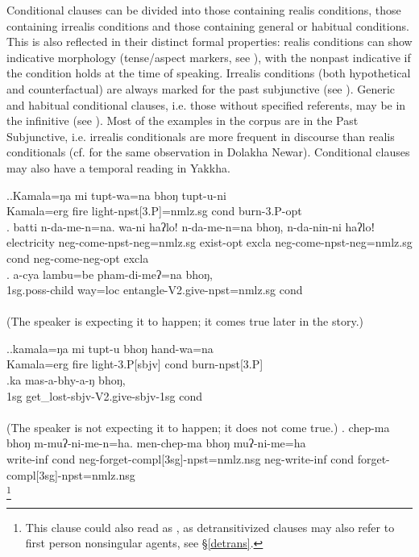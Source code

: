 Conditional clauses can be divided into those containing realis conditions, those containing irrealis conditions and those containing general or habitual conditions. This is also reflected in their  distinct formal properties: realis conditions can show indicative morphology (tense/aspect markers, see \Next), with the nonpast indicative if the condition holds at the time of speaking. Irrealis conditions (both hypothetical and counterfactual) are always marked for the past subjunctive (see \NNext). Generic and habitual conditional clauses, i.e. those without specified referents, may be in the infinitive (see \NNext[c]). Most of the examples in the  corpus are in the Past Subjunctive, i.e. irrealis conditionals are more frequent in discourse than realis conditionals (cf. \citet[463]{Genetti2007_Newari} for the same observation in Dolakha Newar). Conditional clauses may also have a temporal reading in Yakkha. 


	\ex.\ag.Kamala=ŋa mi tupt-wa=na bhoŋ tupt-u-ni \\
	Kamala{\sc =erg} fire   light{\sc -npst[3.P]=nmlz.sg} {\sc cond} burn{\sc -3.P-opt}\\
	\bg.	batti n-da-me-n=na. wa-ni haʔlo! n-da-me-n=na bhoŋ, n-da-nin-ni haʔloǃ\\
	electricity   {\sc neg-}come{\sc [3sg]-npst-neg=nmlz.sg} exist{\sc [sbjv]-opt} {\sc excla} {\sc neg-}come{\sc [3sg]-npst-neg=nmlz.sg} {\sc cond} {\sc neg-}come{\sc [3sg]-neg-opt} {\sc excla} \\
\bg. a-cya            lambu=be    pham-di-meʔ=na bhoŋ,\\
{\sc 1sg.poss-}child way{\sc =loc} entangle{\sc -V2.give-npst=nmlz.sg} {\sc cond}\\
  \\
(The speaker is expecting it to happen; it comes true later in the story.)

	
	\ex.\ag.kamala=ŋa mi tupt-u bhoŋ hand-wa=na\\
	Kamala{\sc =erg} fire   light{\sc -3.P[sbjv]} {\sc cond} burn{\sc -npst[3.P]}\\
		\bg.\label{cond-sbjv}ka  mas-a-bhy-a-ŋ bhoŋ, \\
{\sc 1sg} get\_lost{\sc -sbjv-V2.give-sbjv-1sg} {\sc cond}\\
 \\
(The speaker is not expecting it to happen; it does not come true.)
\bg. chep-ma bhoŋ m-muʔ-ni-me-n=ha. men-chep-ma bhoŋ muʔ-ni-me=ha\\
write{\sc -inf} {\sc cond} {\sc neg-}forget{\sc -compl[3sg]-npst=nmlz.nsg} {\sc neg-}write{\sc -inf} {\sc cond} forget{\sc -compl[3sg]-npst=nmlz.nsg}\\
\footnote{This clause could also read as , as detransitivized clauses may also refer to first person nonsingular agents, see §\ref{detrans}.}


